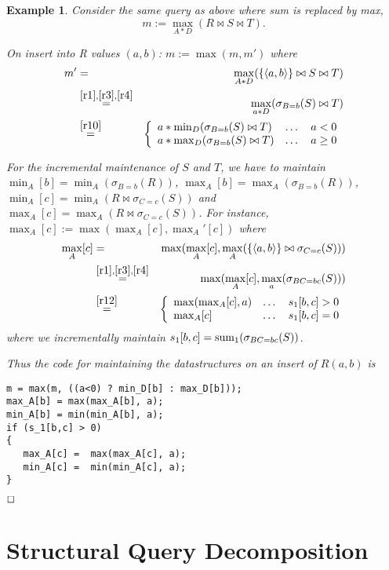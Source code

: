 \documentclass[10pt,twocolumn]{article}
\def\punto{$\hspace*{\fill}\Box$}
\newcommand{\tuple}[1]{{\langle#1\rangle}}
\newtheorem{example}[theorem]{Example}
\begin{document}
\begin{example}\em
Consider the same query as above where sum is replaced by max,
\[
m := \max_{A*D}(R \bowtie S \bowtie T).
\]

On insert into R values $(a,b)$: $m := \max(m, m')$ where
\begin{eqnarray*}
m' &=&
\max_{A*D}(\{\tuple{a,b}\} \bowtie S \bowtie T)
\\
&\stackrel{\ref{r1},\ref{r3},\ref{r4}}{=}&
\max_{a*D}(\sigma_{B=b}(S) \bowtie T)
\\
&\stackrel{\ref{r10}}{=}&
\left\{
\begin{array}{lll}
a * \min_{D}(\sigma_{B=b}(S) \bowtie T) & \dots & a < 0 \\
a * \max_{D}(\sigma_{B=b}(S) \bowtie T) & \dots & a \ge 0
\end{array}
\right.
\end{eqnarray*}

For the incremental maintenance of $S$ and $T$, we have to maintain
$\min_A[b] = \min_A(\sigma_{B=b}(R))$,
$\max_A[b] = \max_A(\sigma_{B=b}(R))$,
$\min_A[c] = \min_A(R \bowtie \sigma_{C=c}(S))$ and
$\max_A[c] = \max_A(R \bowtie \sigma_{C=c}(S))$.
For instance,
$\max_A[c] := \max(\max_A[c], \max_A'[c])$
where
\begin{eqnarray*}
\max_A[c] &=&
\max(\max_A[c], \max_A(\{\tuple{a,b}\} \bowtie \sigma_{C=c}(S)))
\\
&\stackrel{\ref{r1},\ref{r3},\ref{r4}}{=}&
\max(\max_A[c], \max_a(\sigma_{BC=bc}(S)))
\\
&\stackrel{\ref{r12}}{=}&
\left\{
\begin{array}{lll}
\max(\max_A[c], a) & \dots & s_1[b,c] > 0 \\
\max_A[c]          & \dots & s_1[b,c] = 0
\end{array}
\right.
\end{eqnarray*}
where we incrementally maintain
$s_1[b,c] = \mathrm{sum}_1(\sigma_{BC=bc}(S))$.

Thus the code for maintaining the datastructures on an insert of $R(a,b)$ is
\begin{verbatim}
m = max(m, ((a<0) ? min_D[b] : max_D[b]));
max_A[b] = max(max_A[b], a);
min_A[b] = min(min_A[b], a);
if (s_1[b,c] > 0)
{
   max_A[c] =  max(max_A[c], a);
   min_A[c] =  min(min_A[c], a);
}
\end{verbatim}
\punto
\end{example}


\section{Structural Query Decomposition}
\end{document}
